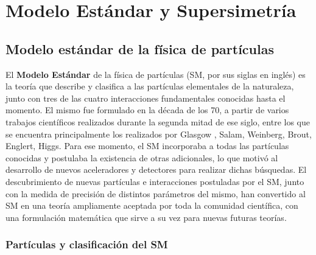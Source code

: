 \chapter{Modelo Estándar y Supersimetría}

\section{Modelo estándar de la física de partículas}

El \textbf{Modelo Estándar} de la física de partículas (SM, por sus siglas en inglés) es la teoría que describe y clasifica a las partículas elementales de la naturaleza, junto con tres de las cuatro interacciones fundamentales conocidas hasta el momento. El mismo fue formulado en la década de los 70, a partir de varios trabajos científicos realizados durante la segunda mitad de ese siglo, entre los que se encuentra principalmente los realizados por Glasgow \cite{GLASHOW1961579}, Salam\cite{salam}, Weinberg\cite{PhysRevLett.19.1264}, Brout, Englert, Higgs\cite{PhysRevLett.13.321, PhysRevLett.13.508,PhysRevLett.13.585}. Para ese momento, el SM incorporaba a todas las partículas conocidas y postulaba la existencia de otras adicionales, lo que motivó al desarrollo de nuevos aceleradores y detectores para realizar dichas búsquedas. El descubrimiento de nuevas partículas e interacciones postuladas por el SM, junto con la medida de precisión de distintos parámetros del mismo, han convertido al SM en una teoría ampliamente aceptada por toda la comunidad científica, con una formulación matemática que sirve a su vez para nuevas futuras teorías.

\subsection{Partículas y clasificación del SM}

